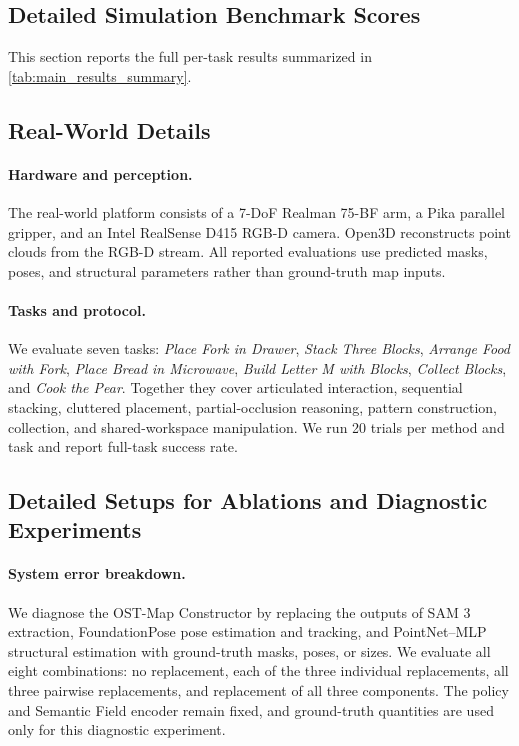 



\subsection{Detailed Simulation Benchmark Scores}
\label{app:full_sim_results}

This section reports the full per-task results summarized in
\cref{tab:main_results_summary}.





\subsection{Real-World Details}
\label{app:real_world_details}

\paragraph{Hardware and perception.}
The real-world platform consists of a 7-DoF Realman 75-BF arm, a Pika parallel
gripper, and an Intel RealSense D415 RGB-D camera. Open3D reconstructs point
clouds from the RGB-D stream. All reported evaluations use predicted masks,
poses, and structural parameters rather than ground-truth map inputs.

\paragraph{Tasks and protocol.}
We evaluate seven tasks: \textit{Place Fork in Drawer},
\textit{Stack Three Blocks}, \textit{Arrange Food with Fork},
\textit{Place Bread in Microwave}, \textit{Build Letter M with Blocks},
\textit{Collect Blocks}, and \textit{Cook the Pear}. Together they cover
articulated interaction, sequential stacking, cluttered placement,
partial-occlusion reasoning, pattern construction, collection, and
shared-workspace manipulation. We run 20 trials per method and task and report
full-task success rate.

\subsection{Detailed Setups for Ablations and Diagnostic Experiments}
\label{app:additional_experiment_details}

\paragraph{System error breakdown.}
We diagnose the OST-Map Constructor by replacing the outputs of SAM 3
extraction, FoundationPose pose estimation and tracking, and PointNet--MLP
structural estimation with ground-truth masks, poses, or sizes. We evaluate
all eight combinations: no replacement, each of the three individual
replacements, all three pairwise replacements, and replacement of all three
components. The policy and Semantic Field encoder remain fixed, and
ground-truth quantities are used only for this diagnostic experiment.


